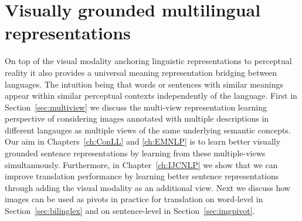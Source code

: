 
\section{Visually grounded multilingual representations}
\label{sec:vismulti}

On top of the visual modality anchoring linguistic representations to perceptual reality it
also provides a universal meaning representation bridging between languages.
The  intuition being that words or sentences with similar meanings appear
within similar perceptual contexts independently of the language. 
First in Section~\ref{sec:multiview} we discuss
the multi-view representation learning perspective of considering images annotated 
with multiple descriptions in different langauges as multiple views of the 
same underlying semantic concepts.
Our aim in Chapters~\ref{ch:ConLL} and \ref{ch:EMNLP} is to learn 
better visually grounded sentence representations by learning from these multiple-views 
simultanuously. Furthermore, in Chapter~\ref{ch:IJCNLP} we show that we can improve
translation performance by learning better sentence representations through  adding the visual
modality as an additional view.
Next we discuss how images can be used as pivots in practice for translation on word-level in 
Section~\ref{sec:bilinglex} and on sentence-level in Section~\ref{sec:imgpivot}.  


